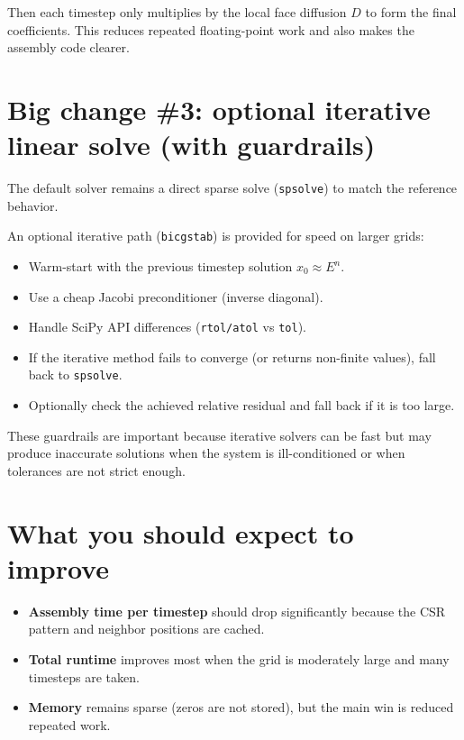 \documentclass[11pt]{article}
\begin{document}
Then each timestep only multiplies by the local face diffusion $D$ to form the final coefficients. This reduces repeated floating-point work and also makes the assembly code clearer.

\section*{Big change \#3: optional iterative linear solve (with guardrails)}
The default solver remains a direct sparse solve (\texttt{spsolve}) to match the reference behavior.

An optional iterative path (\texttt{bicgstab}) is provided for speed on larger grids:
\begin{itemize}
  \item Warm-start with the previous timestep solution $x_0 \approx E^n$.
  \item Use a cheap Jacobi preconditioner (inverse diagonal).
  \item Handle SciPy API differences (\texttt{rtol/atol} vs \texttt{tol}).
  \item If the iterative method fails to converge (or returns non-finite values), fall back to \texttt{spsolve}.
  \item Optionally check the achieved relative residual and fall back if it is too large.
\end{itemize}

These guardrails are important because iterative solvers can be fast but may produce inaccurate solutions when the system is ill-conditioned or when tolerances are not strict enough.

\section*{What you should expect to improve}
\begin{itemize}
  \item \textbf{Assembly time per timestep} should drop significantly because the CSR pattern and neighbor positions are cached.
  \item \textbf{Total runtime} improves most when the grid is moderately large and many timesteps are taken.
  \item \textbf{Memory} remains sparse (zeros are not stored), but the main win is reduced repeated work.
\end{itemize}
\end{document}
